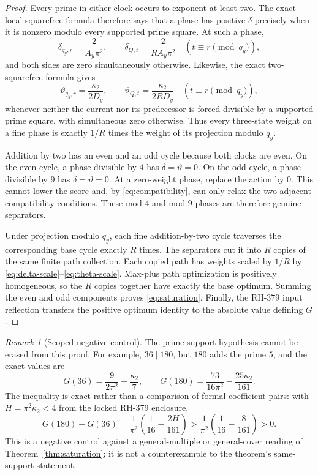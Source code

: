 \documentclass[11pt]{article}
\theoremstyle{definition}
\theoremstyle{remark}
\newtheorem{remark}[theorem]{Remark}
\newcommand{\kap}{\kappa_2}
\newcommand{\dd}{\delta}
\newcommand{\thh}{\vartheta}
\begin{document}
\begin{proof}
Every prime in either clock occurs to exponent at least two.  The exact
local squarefree formula therefore says that a phase has positive
$\dd$ precisely when it is nonzero modulo every supported prime square.
At such a phase,
\begin{equation}
 \dd_{q_y,r}=\frac{2}{A_y\pi^2},\qquad
 \dd_{Q,t}=\frac{2}{RA_y\pi^2}
 \quad(t\equiv r\pmod{q_y}),
 \label{eq:delta-scale}
\end{equation}
and both sides are zero simultaneously otherwise.  Likewise, the exact
two-squarefree formula gives
\begin{equation}
 \thh_{q_y,r}=\frac{\kap}{2D_y},\qquad
 \thh_{Q,t}=\frac{\kap}{2RD_y}
 \quad(t\equiv r\pmod{q_y}),
 \label{eq:theta-scale}
\end{equation}
whenever neither the current nor its predecessor is forced divisible by a
supported prime square, with simultaneous zero otherwise.  Thus every
three-state weight on a fine phase is exactly $1/R$ times the weight of its
projection modulo $q_y$.

Addition by two has an even and an odd cycle because both clocks are even.
On the even cycle, a phase divisible by $4$ has $\dd=\thh=0$.  On the odd
cycle, a phase divisible by $9$ has $\dd=\thh=0$.  At a zero-weight phase,
replace the action by $0$.  This cannot lower the score and, by
\eqref{eq:compatibility}, can only relax the two adjacent compatibility
conditions.  These mod-$4$ and mod-$9$ phases are therefore genuine
separators.

Under projection modulo $q_y$, each fine addition-by-two cycle traverses
the corresponding base cycle exactly $R$ times.  The separators cut it
into $R$ copies of the same finite path collection.  Each copied path has
weights scaled by $1/R$ by \eqref{eq:delta-scale}--\eqref{eq:theta-scale}.
Max-plus path optimization is positively homogeneous, so the $R$ copies
together have exactly the base optimum.  Summing the even and odd
components proves \eqref{eq:saturation}.  Finally, the RH-379 input
reflection transfers the positive optimum identity to the absolute value
defining $G$.
\end{proof}

\begin{remark}[Scoped negative control]
The prime-support hypothesis cannot be erased from this proof.  For
example, $36\mid180$, but $180$ adds the prime $5$, and the exact values are
\[
 G(36)=\frac{9}{2\pi^2}-\frac{\kap}{7},\qquad
 G(180)=\frac{73}{16\pi^2}-\frac{25\kap}{161}.
\]
The inequality is exact rather than a comparison of formal coefficient
pairs: with $H=\pi^2\kap<4$ from the locked RH-379 enclosure,
\[
 G(180)-G(36)
 =\frac1{\pi^2}\left(\frac1{16}-\frac{2H}{161}\right)
 >\frac1{\pi^2}\left(\frac1{16}-\frac8{161}\right)>0.
\]
This is a negative control against a general-multiple or general-cover
reading of Theorem~\ref{thm:saturation}; it is not a counterexample to the
theorem's same-support statement.
\end{remark}
\end{document}
